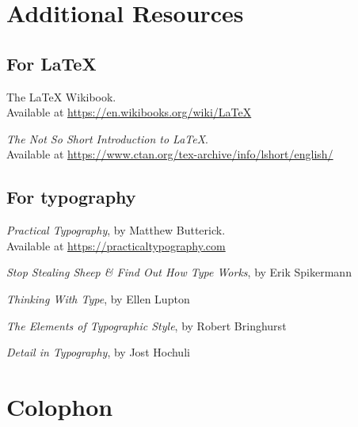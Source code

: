 \setlength\parskip{\baselineskip}
\setlength\parindent{0pt}

\chapter{Additional Resources}

\section{For \texorpdfstring{\LaTeX}{LaTeX}}

\begin{adjustwidth}{1.5em}{0pt}
The \LaTeX{} Wikibook. \\
Available at \url{https://en.wikibooks.org/wiki/LaTeX}

\textit{The Not So Short Introduction to \LaTeX}. \\
Available at \url{https://www.ctan.org/tex-archive/info/lshort/english/}
\end{adjustwidth}
\vspace{0.3in}

\section{For typography}

\begin{adjustwidth}{1.5em}{0pt}
\textit{Practical Typography}, by Matthew Butterick. \\
Available at \url{https://practicaltypography.com}

\textit{Stop Stealing Sheep \& Find Out How Type Works}, by Erik Spikermann

\textit{Thinking With Type}, by Ellen Lupton

\textit{The Elements of Typographic Style}, by Robert Bringhurst

\textit{Detail in Typography}, by Jost Hochuli
\end{adjustwidth}

\backmatter


{\raggedright
\renewcommand\makeenmark{\theenmark.\enspace}
\theendnotes
}

\chapter{Colophon}


